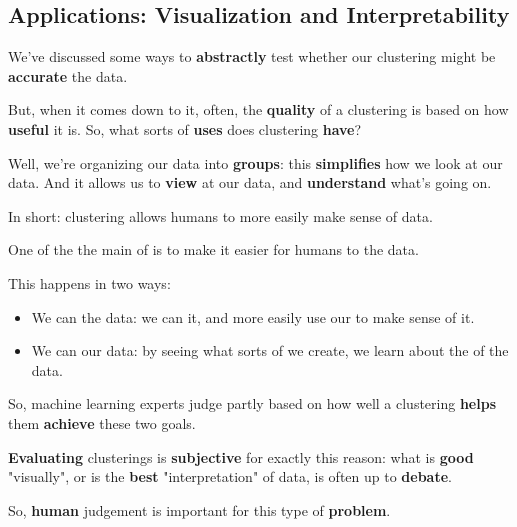     \subsection*{Applications: Visualization and Interpretability}
    
        We've discussed some ways to \textbf{abstractly} test whether our clustering might be \textbf{accurate} the data.
        
        But, when it comes down to it, often, the \textbf{quality} of a clustering is based on how \textbf{useful} it is. So, what sorts of \textbf{uses} does clustering \textbf{have}? 
        
        Well, we're organizing our data into \textbf{groups}: this \textbf{simplifies} how we look at our data. And it allows us to \textbf{view} at our data, and \textbf{understand} what's going on.
        
        In short: clustering allows humans to more easily make sense of data.\\
        
        \begin{concept}
            One of the the main  of  is to make it easier for humans to  the data.
            
            This happens in two ways:
            
            \begin{itemize}
                \item We can  the data: we can  it, and more easily use our  to make sense of it.
                
                \item We can  our data: by seeing what sorts of  we create, we learn about the  of the data.
            \end{itemize}
        \end{concept}
        
        So, machine learning experts judge partly based on how well a clustering \textbf{helps} them \textbf{achieve} these two goals.
        
        \textbf{Evaluating} clusterings is \textbf{subjective} for exactly this reason: what is \textbf{good} "visually", or is the \textbf{best} "interpretation" of data, is often up to \textbf{debate}.
        
        So, \textbf{human} judgement is important for this type of \textbf{problem}.
    
